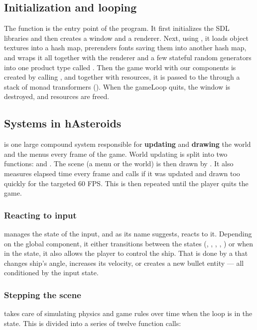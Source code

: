 \documentclass[
  digital, %
  color,   %
  table,   %
  oneside, %
  lof,     %
  lot,     %
]{fithesis3}
\begin{document}
\subsection{Initialization and looping}
\label{sect:initialization}
The  function is the entry point of the program. It first initializes
the SDL libraries and then creates a window and a renderer. Next, using ,
it loads object textures into a hash map, prerenders fonts saving them into another
hash map, and wraps it all together with the renderer and a few stateful random generators
into one product type called . Then the game world with our
components is created by calling , and together with resources,
it is passed to the  through a stack
of monad transformers (). When the gameLoop quits,
the window is destroyed, and resources are freed.


\subsection{Systems in hAsteroids}

 is one large compound system responsible for \textbf{updating} and \textbf{drawing}
the world and the menus every frame of the game. World updating is split
into two functions:  and .
The scene (a menu or the world) is then drawn by .
It also measures elapsed time every frame and calls  if it was
updated and drawn too quickly for the targeted 60 FPS.
This is then repeated until the player quits the game.

\subsubsection{\textbf{Reacting to input}}
 manages the state of the input, and as its name suggests,
reacts to it. Depending on the global  component,
it either transitions between the states (, ,
, , ) or
when in the  state, it also allows the player to control the ship.
That is done by a  that changes ship's angle,
increases its velocity, or creates a new bullet entity --- all conditioned by the input state.

\subsubsection{\textbf{Stepping the scene}}
 takes care of simulating physics and game rules
over time when the loop is in the  state.
This is divided into a series of twelve function calls:
\end{document}
